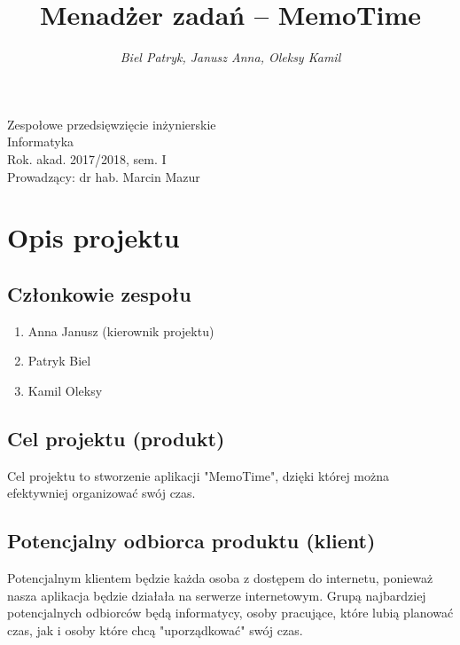 \documentclass[a4paper]{article}
\title{\bf{Menadżer zadań -- MemoTime}}
\author{{\em Biel Patryk, Janusz Anna, Oleksy Kamil}}
\date{}
\begin{document}
\begin{titlepage}
\maketitle
\thispagestyle{empty}
\bigskip
\begin{center}
Zespołowe przedsięwzięcie inżynierskie\\[2mm]

Informatyka\\[2mm]

Rok. akad. 2017/2018, sem. I\\[2mm]

Prowadzący: dr hab. Marcin Mazur
\end{center}
\end{titlepage}

\tableofcontents
\thispagestyle{empty}

\newpage

\section{Opis projektu}
\label{sec:OpisProjektu}

\subsection{Członkowie zespołu}
\label{subsec:CzlonkowieZespolu}

\begin{enumerate}
\item Anna Janusz (kierownik projektu)
\item Patryk Biel
\item Kamil Oleksy
\end{enumerate}

\subsection{Cel projektu (produkt)}
\label{subsec:CelProjektu}

Cel projektu to stworzenie aplikacji "MemoTime", dzięki której można efektywniej organizować swój czas. 

\subsection{Potencjalny odbiorca produktu (klient)}
\label{subsec:PotencjalnyOdbiorcaProduktu}

Potencjalnym klientem będzie każda osoba z  dostępem do internetu, ponieważ nasza aplikacja będzie działała na serwerze internetowym. Grupą najbardziej potencjalnych odbiorców będą informatycy, osoby pracujące, które lubią planować czas, jak i osoby które chcą "uporządkować" swój czas.
\end{document}

